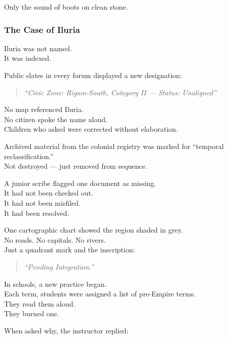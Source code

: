 \documentclass[12pt]{article}
\begin{document}
Only the sound of boots on clean stone.

\dotfill

\subsubsection*{The Case of Iluria}

Iluria was not named.\\
It was indexed.

Public slates in every forum displayed a new designation:

\begin{quote}
\textit{“Civic Zone: Rigum-South, Category II — Status: Unaligned”}
\end{quote}

No map referenced Iluria.\\
No citizen spoke the name aloud.\\
Children who asked were corrected without elaboration.

\vspace{1em}

Archived material from the colonial registry was marked for “temporal reclassification.”\\
Not destroyed — just removed from sequence.

A junior scribe flagged one document as missing.\\
It had not been checked out.\\
It had not been misfiled.\\
It had been resolved.

\vspace{1em}

One cartographic chart showed the region shaded in grey.\\
No roads. No capitals. No rivers.\\
Just a quadrant mark and the inscription:

\begin{quote}
\textit{“Pending Integration.”}
\end{quote}

\vspace{1em}

In schools, a new practice began.\\
Each term, students were assigned a list of pre-Empire terms.\\
They read them aloud.\\
They burned one.

When asked why, the instructor replied:
\end{document}
